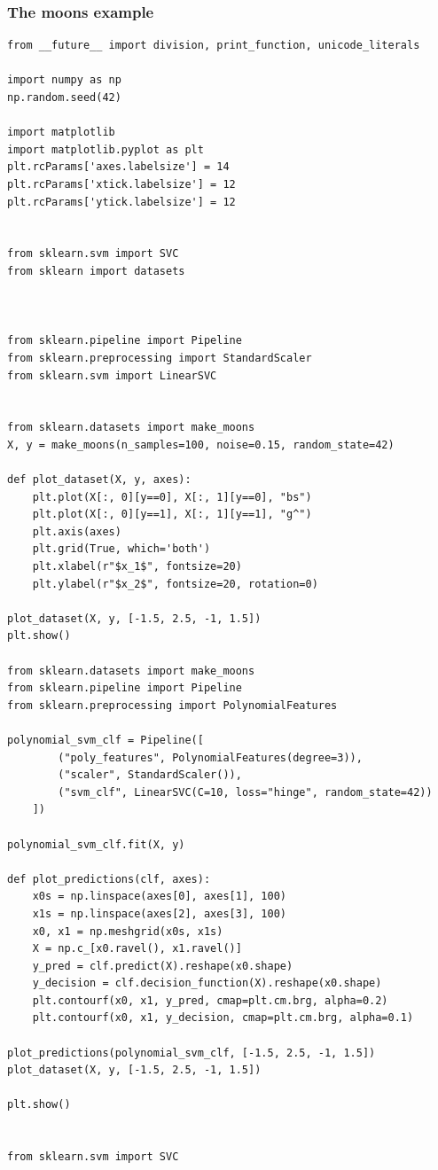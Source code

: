 \documentclass{beamer}
\begin{document}
\begin{frame}
\frametitle{The moons example}

\begin{lstlisting}
from __future__ import division, print_function, unicode_literals

import numpy as np
np.random.seed(42)

import matplotlib
import matplotlib.pyplot as plt
plt.rcParams['axes.labelsize'] = 14
plt.rcParams['xtick.labelsize'] = 12
plt.rcParams['ytick.labelsize'] = 12


from sklearn.svm import SVC
from sklearn import datasets



from sklearn.pipeline import Pipeline
from sklearn.preprocessing import StandardScaler
from sklearn.svm import LinearSVC


from sklearn.datasets import make_moons
X, y = make_moons(n_samples=100, noise=0.15, random_state=42)

def plot_dataset(X, y, axes):
    plt.plot(X[:, 0][y==0], X[:, 1][y==0], "bs")
    plt.plot(X[:, 0][y==1], X[:, 1][y==1], "g^")
    plt.axis(axes)
    plt.grid(True, which='both')
    plt.xlabel(r"$x_1$", fontsize=20)
    plt.ylabel(r"$x_2$", fontsize=20, rotation=0)

plot_dataset(X, y, [-1.5, 2.5, -1, 1.5])
plt.show()

from sklearn.datasets import make_moons
from sklearn.pipeline import Pipeline
from sklearn.preprocessing import PolynomialFeatures

polynomial_svm_clf = Pipeline([
        ("poly_features", PolynomialFeatures(degree=3)),
        ("scaler", StandardScaler()),
        ("svm_clf", LinearSVC(C=10, loss="hinge", random_state=42))
    ])

polynomial_svm_clf.fit(X, y)

def plot_predictions(clf, axes):
    x0s = np.linspace(axes[0], axes[1], 100)
    x1s = np.linspace(axes[2], axes[3], 100)
    x0, x1 = np.meshgrid(x0s, x1s)
    X = np.c_[x0.ravel(), x1.ravel()]
    y_pred = clf.predict(X).reshape(x0.shape)
    y_decision = clf.decision_function(X).reshape(x0.shape)
    plt.contourf(x0, x1, y_pred, cmap=plt.cm.brg, alpha=0.2)
    plt.contourf(x0, x1, y_decision, cmap=plt.cm.brg, alpha=0.1)

plot_predictions(polynomial_svm_clf, [-1.5, 2.5, -1, 1.5])
plot_dataset(X, y, [-1.5, 2.5, -1, 1.5])

plt.show()


from sklearn.svm import SVC


\end{lstlisting}
\end{frame}
\end{document}

